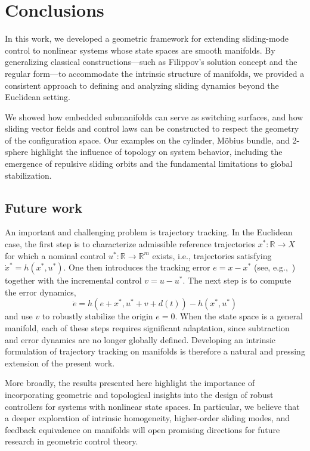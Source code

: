 \documentclass{article}
\theoremstyle{definition}
\theoremstyle{remark}
\newcommand{\MA}{X}	%
\newcommand{\RR}{\mathbb{R}}	%
\begin{document}
\section{Conclusions} \label{sec:conclusion}

In this work, we developed a geometric framework for extending sliding-mode control to nonlinear systems whose state spaces
are smooth manifolds. By generalizing classical constructions---such as Filippov’s solution concept and the regular form---to
accommodate the intrinsic structure of manifolds, we provided a consistent approach to defining and analyzing sliding dynamics
beyond the Euclidean setting.

We showed how embedded submanifolds can serve as switching surfaces, and how sliding vector fields and control laws can be
constructed to respect the geometry of the configuration space. Our examples on the cylinder, M\"obius bundle, and 2-sphere
highlight the influence of topology on system behavior, including the emergence of repulsive sliding orbits and the fundamental
limitations to global stabilization.

\subsection*{Future work}

An important and challenging problem is trajectory tracking. In the Euclidean case, the first step is to 
characterize admissible reference trajectories $x^* : \RR \to \MA$ for which a nominal 
control $u^* : \RR \to \RR^m$ exists, i.e., trajectories satisfying 
$\dot{x}^* = h(x^*,u^*)$. One then introduces the tracking error $e = x - x^*$ 
(see, e.g.,~\cite{sira}) together with the incremental control $v = u - u^*$. The next step is to compute 
the error dynamics,
\begin{displaymath}
 \dot{e} = h(e + x^*, u^* + v + d(t)) - h(x^*, u^*)
\end{displaymath}
and use $v$ to robustly stabilize the origin $e=0$.
When the state space is a general manifold, each of these steps requires significant adaptation, 
since subtraction and error dynamics are no longer globally defined. Developing an intrinsic 
formulation of trajectory tracking on manifolds is therefore a natural and pressing extension of 
the present work.

More broadly, the results presented here highlight the importance of incorporating geometric and 
topological insights into the design of robust controllers for systems with nonlinear state spaces. 
In particular, we believe that a deeper exploration of intrinsic homogeneity, higher-order sliding 
modes, and feedback equivalence on manifolds will open promising directions for future research 
in geometric control theory.



\end{document}
